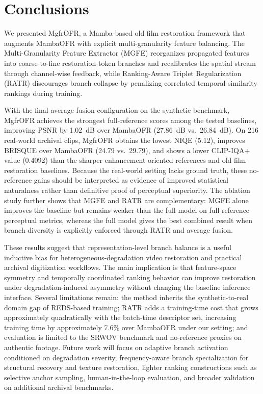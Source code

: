 \section{Conclusions}
\label{sec:conclusion}

We presented MgfrOFR, a Mamba-based old film restoration framework that augments MambaOFR with explicit multi-granularity feature balancing. The Multi-Granularity Feature Extractor (MGFE) reorganizes propagated features into coarse-to-fine restoration-token branches and recalibrates the spatial stream through channel-wise feedback, while Ranking-Aware Triplet Regularization (RATR) discourages branch collapse by penalizing correlated temporal-similarity rankings during training.

With the final average-fusion configuration on the synthetic benchmark, MgfrOFR achieves the strongest full-reference scores among the tested baselines, improving PSNR by 1.02~dB over MambaOFR (27.86~dB vs.\ 26.84~dB). On 216 real-world archival clips, MgfrOFR obtains the lowest NIQE (5.12), improves BRISQUE over MambaOFR (24.79 vs.\ 29.79), and shows a lower CLIP-IQA+ value (0.4092) than the sharper enhancement-oriented references and old film restoration baselines. Because the real-world setting lacks ground truth, these no-reference gains should be interpreted as evidence of improved statistical naturalness rather than definitive proof of perceptual superiority. The ablation study further shows that MGFE and RATR are complementary: MGFE alone improves the baseline but remains weaker than the full model on full-reference perceptual metrics, whereas the full model gives the best combined result when branch diversity is explicitly enforced through RATR and average fusion.

These results suggest that representation-level branch balance is a useful inductive bias for heterogeneous-degradation video restoration and practical archival digitization workflows. The main implication is that feature-space symmetry and temporally coordinated ranking behavior can improve restoration under degradation-induced asymmetry without changing the baseline inference interface. Several limitations remain: the method inherits the synthetic-to-real domain gap of REDS-based training; RATR adds a training-time cost that grows approximately quadratically with the batch-time descriptor set, increasing training time by approximately 7.6\% over MambaOFR under our setting; and evaluation is limited to the SRWOV benchmark and no-reference proxies on authentic footage. Future work will focus on adaptive branch activation conditioned on degradation severity, frequency-aware branch specialization for structural recovery and texture restoration, lighter ranking constructions such as selective anchor sampling, human-in-the-loop evaluation, and broader validation on additional archival benchmarks.
